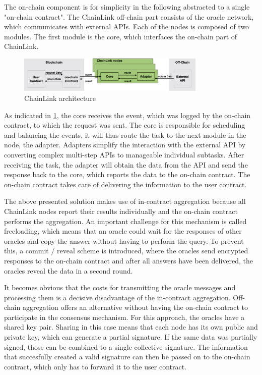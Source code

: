 \documentclass[conference]{IEEEtran}
\begin{document}
The on-chain component is for simplicity in the following abstracted to a single "on-chain contract".
The ChainLink off-chain part consists of the oracle network, which communicates with external APIs. Each of the nodes is composed of two modules. The first module is the core, which interfaces the on-chain part of ChainLink. 
\begin{figure}[h]
	\begin{center}
		\includegraphics[width=9cm]{ChainLink.png}
		\caption{ChainLink architecture}
		\label{chainlink}
	\end{center}
\end{figure}  
As indicated in \ref{chainlink}, the core receives the event, which was logged by the on-chain contract, to which the request was sent. The core is responsible for scheduling and balancing the events, it will thus route the task to the next module in the node, the adapter. Adapters simplify the interaction with the external API by converting complex multi-step APIs to manageable individual subtasks. After receiving the task, the adapter will obtain the data from the API and send the response back to the core, which reports the data to the on-chain contract. The on-chain contract takes care of delivering the information to the user contract. \cite{Ellis2017} \par 
The above presented solution makes use of in-contract aggregation because all ChainLink nodes report their results individually and the on-chain contract performs the aggregation. An important challenge for this mechanism is called freeloading, which means that an oracle could wait for the responses of other oracles and copy the answer without having to perform the query. To prevent this, a commit / reveal scheme is introduced, where the oracles send encrypted responses to the on-chain contract and after all answers have been delivered, the oracles reveal the data in a second round. \cite{Ellis2017} \par 
It becomes obvious that the costs for transmitting the oracle messages and processing them is a decisive disadvantage of the in-contract aggregation. Off-chain aggregation offers an alternative without having the on-chain contract to participate in the consensus mechanism. For this approach, the oracles have a shared key pair. Sharing in this case means that each node has its own public and private key, which can generate a partial signature. If the same data was partially signed, those can be combined to a single collective signature. The information that succesfully created a valid signature can then be passed on to the on-chain contract, which only has to forward it to the user contract. \cite{Ellis2017} \par   
\end{document}
